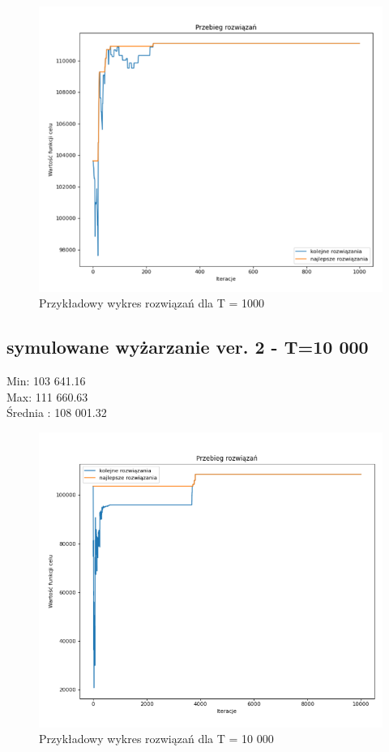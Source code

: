 \documentclass{article}
\begin{document}
\begin{figure}[H]
	\centering
	\includegraphics[width=0.7\linewidth]{screens/AnneallingV2_1000}
	\caption{Przykładowy wykres rozwiązań dla T = 1000}
	\label{fig:anneallingv21000}
\end{figure}


\subsection{symulowane wyżarzanie ver. 2 - T=10 000}

Min: 103 641.16\\
Max: 111 660.63\\
Średnia : 108 001.32\\

\begin{figure}[H]
	\centering
	\includegraphics[width=0.7\linewidth]{screens/annealing_v2_10000}
	\caption{Przykładowy wykres rozwiązań dla T = 10 000}
	\label{fig:annealingv210000}
\end{figure}
\end{document}
